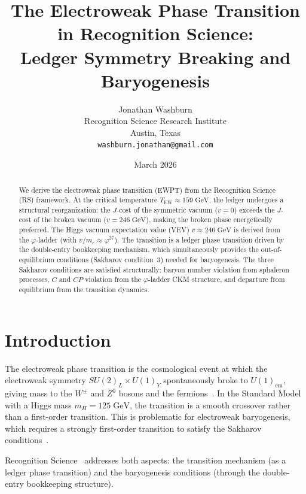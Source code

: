 \documentclass[12pt,a4paper]{article}
\title{The Electroweak Phase Transition in Recognition Science:\\
Ledger Symmetry Breaking and Baryogenesis}
\author{Jonathan Washburn\\
Recognition Science Research Institute\\
Austin, Texas\\
\texttt{washburn.jonathan@gmail.com}}
\date{March 2026}
\theoremstyle{definition}
\theoremstyle{remark}
\begin{document}
\maketitle

\begin{abstract}
We derive the electroweak phase transition (EWPT) from the
Recognition Science (RS) framework.  At the critical temperature
$T_{\mathrm{EW}} \approx 159\;\mathrm{GeV}$, the ledger undergoes a
structural reorganization: the $J$-cost of the symmetric vacuum
($v = 0$) exceeds the $J$-cost of the broken vacuum
($v = 246\;\mathrm{GeV}$), making the broken phase energetically
preferred.  The Higgs vacuum expectation value (VEV)
$v \approx 246\;\mathrm{GeV}$ is derived from the $\varphi$-ladder
(with $v/m_e \approx \varphi^{27}$).  The transition is a ledger
phase transition driven by the double-entry bookkeeping mechanism,
which simultaneously provides the out-of-equilibrium conditions
(Sakharov condition~3) needed for baryogenesis.  The three Sakharov
conditions are satisfied structurally: baryon number violation from
sphaleron processes, $C$ and $CP$ violation from the
$\varphi$-ladder CKM structure, and departure from equilibrium from
the transition dynamics.
\end{abstract}

\section{Introduction}
\label{sec:intro}

The electroweak phase transition is the cosmological event at which
the electroweak symmetry $SU(2)_L \times U(1)_Y$ spontaneously broke
to $U(1)_{\mathrm{em}}$, giving mass to the $W^\pm$ and $Z^0$ bosons
and the fermions~\cite{Weinberg1967, Shaposhnikov1986}.  In the
Standard Model with a Higgs mass $m_H = 125\;\mathrm{GeV}$, the
transition is a smooth crossover rather than a first-order
transition.  This is problematic for electroweak baryogenesis, which
requires a strongly first-order transition to satisfy the Sakharov
conditions~\cite{Sakharov1967}.

Recognition Science~\cite{RS_Axioms} addresses both aspects: the
transition mechanism (as a ledger phase transition) and the
baryogenesis conditions (through the double-entry bookkeeping
structure).

\end{document}

